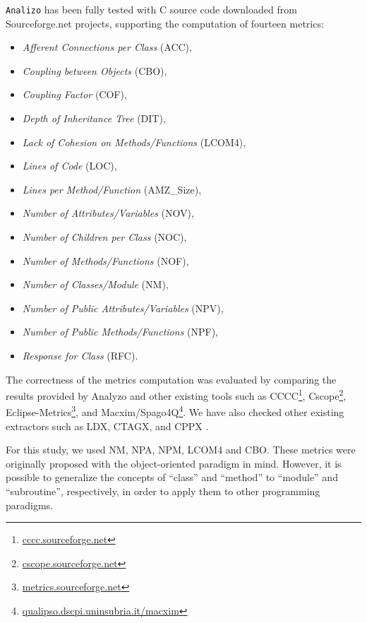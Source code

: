 \documentclass[conference]{IEEEtran}
\begin{document}
\texttt{Analizo} has been fully tested with C source code downloaded from Sourceforge.net projects, 
supporting the computation of  fourteen metrics:
\begin{itemize}
\item \emph{Afferent Connections per Class} (ACC),
\item \emph{Coupling between Objects} (CBO),
\item \emph{Coupling Factor} (COF),
\item \emph{Depth of Inheritance Tree} (DIT),
\item \emph{Lack of Cohesion on Methods/Functions} (LCOM4),
\item \emph{Lines of Code} (LOC),
\item \emph{Lines per Method/Function} (AMZ\_Size),
\item \emph{Number of Attributes/Variables} (NOV),
\item \emph{Number of Children per Class} (NOC),
\item \emph{Number of Methods/Functions} (NOF),
\item \emph{Number of Classes/Module} (NM),
\item \emph{Number of Public Attributes/Variables} (NPV),
\item \emph{Number of Public Methods/Functions} (NPF),
\item \emph{Response for Class} (RFC).
\end{itemize}
The correctness of the metrics computation was evaluated by comparing the 
results provided by Analyzo and other existing 
tools such as
%
CCCC\footnote{\url{cccc.sourceforge.net}},
Cscope\footnote{\url{cscope.sourceforge.net}},
Eclipse-Metrics\footnote{\url{metrics.sourceforge.net}},
and Macxim/Spago4Q\footnote{\url{qualipso.dscpi.uninsubria.it/macxim}}.
%
We have also checked other existing extractors such as LDX, CTAGX, and CPPX \cite{hassan05}.

For this study, we used NM, NPA, NPM, 
LCOM4 and CBO. 
These metrics were originally proposed with the object-oriented paradigm in mind.
%
However, it is possible to generalize the concepts of ``class'' and ``method''
to ``module'' and ``subroutine'', respectively, in order to apply them to
other programming paradigms.
\end{document}
